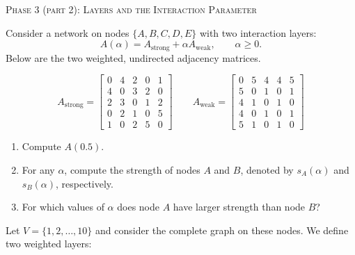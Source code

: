 \documentclass[10pt]{article}
\begin{document}
\begin{center}
\Large{\textsc{Phase 3 (part 2): Layers and the Interaction Parameter}}\\
\end{center}

\begin{enumerate}[{$1.]$}]


\item Consider a network on nodes $\{A,B,C,D,E\}$ with two interaction layers:
\[ A(\alpha)=A_{\text{strong}}+\alpha A_{\text{weak}}, \qquad \alpha\ge 0. \]
Below are the two weighted, undirected adjacency matrices. 

\[ A_{\text{strong}} = 
\begin{bmatrix}
0 & 4 & 2 & 0 & 1 \\
4 & 0 & 3 & 2 & 0 \\
2 & 3 & 0 & 1 & 2 \\
0 & 2 & 1 & 0 & 5 \\
1 & 0 & 2 & 5 & 0 \end{bmatrix}  \qquad A_{\text{weak}} = 
\begin{bmatrix}
0 & 5 & 4 & 4 & 5 \\
5 & 0 & 1 & 0 & 1 \\
4 & 1 & 0 & 1 & 0 \\
4 & 0 & 1 & 0 & 1 \\
5 & 1 & 0 & 1 & 0  \end{bmatrix} \]

\begin{enumerate}[{$a.)$}]


\item Compute $A(0.5)$.
\vfill



\item For any $\alpha$, compute the strength of nodes $A$ and $B$, denoted by $s_A(\alpha)$ and $s_B(\alpha)$, respectively. 
\vfill

\item For which values of $\alpha$ does node $A$ have larger strength than node $B$?

\vfill


\end{enumerate}

\pagebreak

\item Let $V=\{1,2,\dots,10\}$ and consider the complete graph on these nodes. We define two weighted layers:


\end{enumerate}
\end{document}
